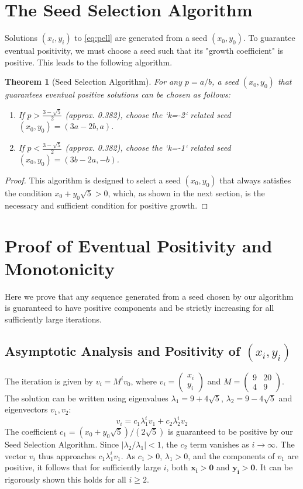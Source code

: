 \documentclass[12pt]{article}
\newtheorem{theorem}{Theorem}
\begin{document}
\section{The Seed Selection Algorithm}
Solutions $(x_i, y_i)$ to \eqref{eq:pell} are generated from a seed $(x_0, y_0)$. To guarantee eventual positivity, we must choose a seed such that its "growth coefficient" is positive. This leads to the following algorithm.

\begin{theorem}[Seed Selection Algorithm]
For any $p=a/b$, a seed $(x_0, y_0)$ that guarantees eventual positive solutions can be chosen as follows:
\begin{enumerate}
    \item If $p > \frac{3-\sqrt{5}}{2}$ (approx. 0.382), choose the `k=-2` related seed $(x_0, y_0) = (3a - 2b, a)$.
    \item If $p < \frac{3-\sqrt{5}}{2}$ (approx. 0.382), choose the `k=-1` related seed $(x_0, y_0) = (3b - 2a, -b)$.
\end{enumerate}
\end{theorem}
\begin{proof}
This algorithm is designed to select a seed $(x_0, y_0)$ that always satisfies the condition $x_0 + y_0\sqrt{5} > 0$, which, as shown in the next section, is the necessary and sufficient condition for positive growth.
\end{proof}

\section{Proof of Eventual Positivity and Monotonicity}
Here we prove that any sequence generated from a seed chosen by our algorithm is guaranteed to have positive components and be strictly increasing for all sufficiently large iterations.

\subsection{Asymptotic Analysis and Positivity of $(x_i, y_i)$}
The iteration is given by $v_i = M^i v_0$, where $v_i = \begin{pmatrix} x_i \\ y_i \end{pmatrix}$ and $M = \begin{pmatrix} 9 & 20 \\ 4 & 9 \end{pmatrix}$.
The solution can be written using eigenvalues $\lambda_1 = 9+4\sqrt{5}$, $\lambda_2 = 9-4\sqrt{5}$ and eigenvectors $v_1, v_2$:
$$v_i = c_1 \lambda_1^i v_1 + c_2 \lambda_2^i v_2$$
The coefficient $c_1 = (x_0 + y_0\sqrt{5})/(2\sqrt{5})$ is guaranteed to be positive by our Seed Selection Algorithm. Since $|\lambda_2/\lambda_1|<1$, the $c_2$ term vanishes as $i \to \infty$. The vector $v_i$ thus approaches $c_1 \lambda_1^i v_1$. As $c_1>0$, $\lambda_1>0$, and the components of $v_1$ are positive, it follows that for sufficiently large $i$, both $\boldsymbol{x_i > 0}$ and $\boldsymbol{y_i > 0}$. It can be rigorously shown this holds for all $i \ge 2$.
\end{document}
